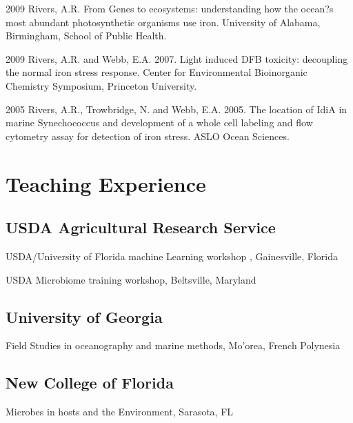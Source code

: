 \documentclass[12pt,letterpaper]{report}
\newcommand{\listitemspace}{0.15em}
\renewenvironment{itemize}
{\begin{list}{}{\setlength{\leftmargin}{0em}
            \setlength{\parskip}{0em}
            \setlength{\itemsep}{\listitemspace}
            \setlength{\parsep}{\listitemspace}}}
    {\end{list}}
\begin{document}
\begin{tablist}
\item[2009] \tab Rivers, A.R. From Genes to ecosystems: understanding how the ocean?s most abundant photosynthetic organisms use iron. University of Alabama, Birmingham, School of Public Health.

\item[2009] \tab Rivers, A.R. and Webb, E.A. 2007. Light induced DFB toxicity: decoupling the normal iron stress response. Center for Environmental Bioinorganic Chemistry Symposium, Princeton University. 

\item[2005] \tab Rivers, A.R., Trowbridge, N. and Webb, E.A. 2005. The location of IdiA in marine Synechococcus and development of a whole cell labeling and flow cytometry assay for detection of iron stress. ASLO Ocean Sciences.

		

    \end{tablist}





    \section*{Teaching Experience}

    \subsection*{USDA Agricultural Research Service}  
    \begin{itemize} 	
    	\item USDA/University of Florida machine Learning workshop , Gainesville, Florida
    	\item USDA Microbiome training workshop, Beltsville, Maryland
	\end{itemize}
    	
    \subsection*{University of Georgia}
        \begin{itemize}
    	\item Field Studies in oceanography and marine methods, Mo'orea, French Polynesia
	\end{itemize}

    \subsection*{New College of Florida}
            \begin{itemize}
    	\item Microbes in hosts and the Environment, Sarasota, FL
	\end{itemize}
\end{document}
